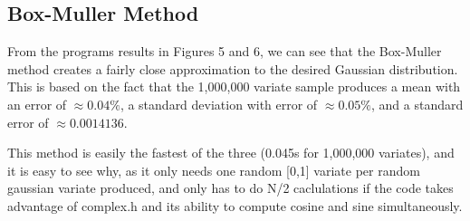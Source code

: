 \documentclass{article}
\begin{document}
\begin{figure}[htb]
\end{figure}





\subsection{Box-Muller Method}

From the programs results in Figures 5 and 6, we can see that the Box-Muller method creates a fairly close approximation to the desired Gaussian distribution. This is based on the fact that the 1,000,000 variate sample produces a mean with an error of $\approx0.04\%$, a standard deviation with error of $\approx0.05\%$, and a standard error of $\approx0.0014136$.

This method is easily the fastest of the three (0.045s for 1,000,000 variates), and it is easy to see why, as it only needs one random [0,1] variate per random gaussian variate produced, and only has to do N/2 caclulations if the code takes advantage of complex.h and its ability to compute cosine and sine simultaneously.

\begin{figure}[htb]
\end{figure}
\end{document}
